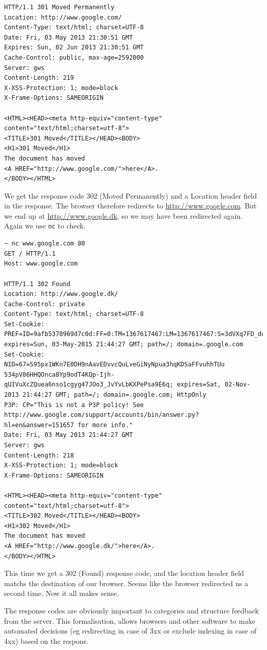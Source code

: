 \documentclass[a4paper]{article}
\begin{document}
\begin{description}
\begin{lstlisting}
HTTP/1.1 301 Moved Permanently
Location: http://www.google.com/
Content-Type: text/html; charset=UTF-8
Date: Fri, 03 May 2013 21:30:51 GMT
Expires: Sun, 02 Jun 2013 21:30:51 GMT
Cache-Control: public, max-age=2592000
Server: gws
Content-Length: 219
X-XSS-Protection: 1; mode=block
X-Frame-Options: SAMEORIGIN

<HTML><HEAD><meta http-equiv="content-type" content="text/html;charset=utf-8">
<TITLE>301 Moved</TITLE></HEAD><BODY>
<H1>301 Moved</H1>
The document has moved
<A HREF="http://www.google.com/">here</A>.
</BODY></HTML>
\end{lstlisting}
We get the response code 302 (Moved Permanently) and a Location header field in
the response. The browser therefore redirects to \url{http://www.google.com}.
But we end up at \url{http://www.google.dk}, so we may have been redirected
again. Again we use \texttt{nc} to check.

\begin{lstlisting}
~ nc www.google.com 80
GET / HTTP/1.1
Host: www.google.com

HTTP/1.1 302 Found
Location: http://www.google.dk/
Cache-Control: private
Content-Type: text/html; charset=UTF-8
Set-Cookie: PREF=ID=9afb5378969d7c0d:FF=0:TM=1367617467:LM=1367617467:S=3dVXq7FD_dcXVzbV; expires=Sun, 03-May-2015 21:44:27 GMT; path=/; domain=.google.com
Set-Cookie: NID=67=S95px1WKn7E0DH9nAavEDvvcQuLveGiNyNpua3hqKDSaFFvuhhTUu 534pV86HHQOnca8Yp9odT4KQp-Ijh-qUIVuXcZQuea6nso1cgyg47JOo3_JvYvLbKXPePsa9E6q; expires=Sat, 02-Nov-2013 21:44:27 GMT; path=/; domain=.google.com; HttpOnly
P3P: CP="This is not a P3P policy! See http://www.google.com/support/accounts/bin/answer.py?hl=en&answer=151657 for more info."
Date: Fri, 03 May 2013 21:44:27 GMT
Server: gws
Content-Length: 218
X-XSS-Protection: 1; mode=block
X-Frame-Options: SAMEORIGIN

<HTML><HEAD><meta http-equiv="content-type" content="text/html;charset=utf-8">
<TITLE>302 Moved</TITLE></HEAD><BODY>
<H1>302 Moved</H1>
The document has moved
<A HREF="http://www.google.dk/">here</A>.
</BODY></HTML>
\end{lstlisting}
This time we get a 302 (Found) response code, and the location header field
matchs the destination of our browser. Seems like the browser redirected us a
second time. Now it all makes sense.

The response codes are obviously important to categories and  structure
feedback from the server. This formalisation, allows browsers and other
software to make automated decisions (eg redirecting in case of 3xx or exclude
indexing in case of 4xx) based on the respons.
\end{description}
\end{document}
